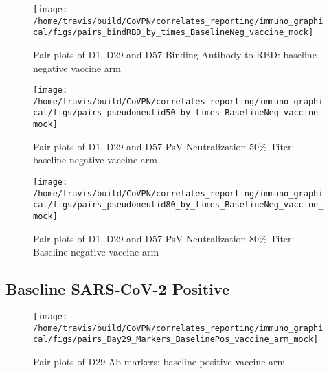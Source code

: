 \documentclass[]{book}
\theoremstyle{definition}
\theoremstyle{definition}
\theoremstyle{definition}
\newcommand{\1}{\mathbbm{1}}
\begin{document}
\clearpage
\begin{figure}[H]

{\centering \texttt{[image: /home/travis/build/CoVPN/correlates\_reporting/immuno\_graphical/figs/pairs\_bindRBD\_by\_times\_BaselineNeg\_vaccine\_mock]} 

}

\caption{Pair plots of D1, D29 and D57 Binding Antibody to RBD: baseline negative vaccine arm}\label{fig:unnamed-chunk-10}
\end{figure}

\clearpage
\begin{figure}[H]

{\centering \texttt{[image: /home/travis/build/CoVPN/correlates\_reporting/immuno\_graphical/figs/pairs\_pseudoneutid50\_by\_times\_BaselineNeg\_vaccine\_mock]} 

}

\caption{Pair plots of D1, D29 and D57 PsV Neutralization 50\% Titer: baseline negative vaccine arm}\label{fig:unnamed-chunk-11}
\end{figure}

\clearpage
\begin{figure}[H]

{\centering \texttt{[image: /home/travis/build/CoVPN/correlates\_reporting/immuno\_graphical/figs/pairs\_pseudoneutid80\_by\_times\_BaselineNeg\_vaccine\_mock]} 

}

\caption{Pair plots of D1, D29 and D57 PsV Neutralization 80\% Titer: Baseline negative vaccine arm}\label{fig:unnamed-chunk-12}
\end{figure}

\clearpage

\hypertarget{baseline-sars-cov-2-positive}{%
\subsection{Baseline SARS-CoV-2 Positive}\label{baseline-sars-cov-2-positive}}

\begin{figure}[H]

{\centering \texttt{[image: /home/travis/build/CoVPN/correlates\_reporting/immuno\_graphical/figs/pairs\_Day29\_Markers\_BaselinePos\_vaccine\_arm\_mock]} 

}

\caption{Pair plots of D29 Ab markers: baseline positive vaccine arm}\label{fig:unnamed-chunk-13}
\end{figure}
\end{document}
